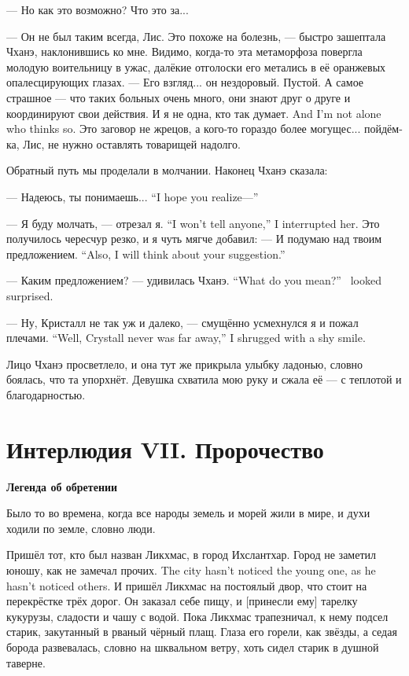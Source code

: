 --- Но как это возможно?
Что это за...

--- Он не был таким всегда, Лис.
Это похоже на болезнь, --- быстро зашептала Чханэ, наклонившись ко мне.
Видимо, когда-то эта метаморфоза повергла молодую воительницу в ужас, далёкие отголоски его метались в её оранжевых опалесцирующих глазах.
--- Его взгляд... он нездоровый.
Пустой.
А самое страшное --- что таких больных очень много, они знают друг о друге и координируют свои действия.
{И я не одна, кто так думает.}
{And I'm not alone who thinks so.}
Это заговор не жрецов, а кого-то гораздо более могущес... пойдём-ка, Лис, не нужно оставлять товарищей надолго.

Обратный путь мы проделали в молчании.
Наконец Чханэ сказала:

{--- Надеюсь, ты понимаешь...}
{``I hope you realize---''}

{--- Я буду молчать, --- отрезал я.}
{``I won't tell anyone,'' I interrupted her.}
Это получилось чересчур резко, и я чуть мягче добавил:
{--- И подумаю над твоим предложением.}
{``Also, I will think about your suggestion.''}

{--- Каким предложением? --- удивилась Чханэ.}
{``What do you mean?'' \Chhanei\ looked surprised.}

{--- Ну, Кристалл не так уж и далеко, --- смущённо усмехнулся я и пожал плечами.}
{``Well, Crystall never was far away,'' I shrugged with a shy smile.}

Лицо Чханэ просветлело, и она тут же прикрыла улыбку ладонью, словно боялась, что та упорхнёт.
Девушка схватила мою руку и сжала её --- с теплотой и благодарностью.

\chapter*{Интерлюдия VII. Пророчество}

\textbf{Легенда об обретении}

Было то во времена, когда все народы земель и морей жили в мире, и духи ходили по земле, словно люди.

Пришёл тот, кто был назван Ликхмас, в город Ихслантхар.
{Город не заметил юношу, как не замечал прочих.}
{The city hasn't noticed the young one, as he hasn't noticed others.}
И пришёл Ликхмас на постоялый двор, что стоит на перекрёстке трёх дорог\FM.
Он заказал себе пищу, и [принесли ему] тарелку кукурузы, сладости и чашу с водой\FM.
Пока Ликхмас трапезничал, к нему подсел старик, закутанный в рваный чёрный плащ.
Глаза его горели, как звёзды, а седая борода развевалась, словно на шквальном ветру, хоть сидел старик в душной таверне.

